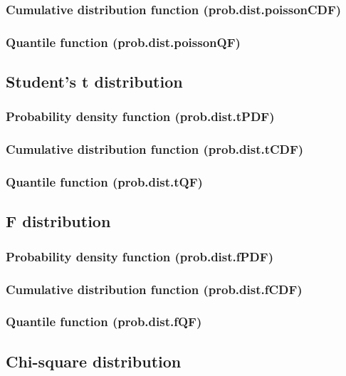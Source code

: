 \documentclass{article}
\theoremstyle{definition}
\begin{document}
\subsubsection{Cumulative distribution function (prob.dist.poissonCDF)}
\subsubsection{Quantile function (prob.dist.poissonQF)}

\subsection{Student's t distribution}
\subsubsection{Probability density function (prob.dist.tPDF)}
\subsubsection{Cumulative distribution function (prob.dist.tCDF)}
\subsubsection{Quantile function (prob.dist.tQF)}

\subsection{F distribution}
\subsubsection{Probability density function (prob.dist.fPDF)}
\subsubsection{Cumulative distribution function (prob.dist.fCDF)}
\subsubsection{Quantile function (prob.dist.fQF)}

\subsection{Chi-square distribution}
\end{document}
